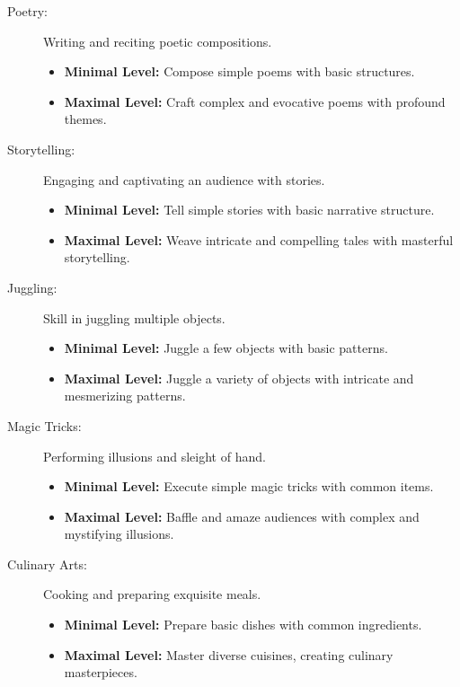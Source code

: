 \documentclass[12pt]{book}
\begin{document}
\begin{description}
    \item[Poetry:] Writing and reciting poetic compositions.
        \begin{itemize}
            \item \textbf{Minimal Level:} Compose simple poems with basic structures.
            \item \textbf{Maximal Level:} Craft complex and evocative poems with profound themes.
        \end{itemize}

    \item[Storytelling:] Engaging and captivating an audience with stories.
        \begin{itemize}
            \item \textbf{Minimal Level:} Tell simple stories with basic narrative structure.
            \item \textbf{Maximal Level:} Weave intricate and compelling tales with masterful storytelling.
        \end{itemize}

    \item[Juggling:] Skill in juggling multiple objects.
        \begin{itemize}
            \item \textbf{Minimal Level:} Juggle a few objects with basic patterns.
            \item \textbf{Maximal Level:} Juggle a variety of objects with intricate and mesmerizing patterns.
        \end{itemize}

    \item[Magic Tricks:] Performing illusions and sleight of hand.
        \begin{itemize}
            \item \textbf{Minimal Level:} Execute simple magic tricks with common items.
            \item \textbf{Maximal Level:} Baffle and amaze audiences with complex and mystifying illusions.
        \end{itemize}

    \item[Culinary Arts:] Cooking and preparing exquisite meals.
        \begin{itemize}
            \item \textbf{Minimal Level:} Prepare basic dishes with common ingredients.
            \item \textbf{Maximal Level:} Master diverse cuisines, creating culinary masterpieces.
        \end{itemize}

\end{description}
\end{document}
